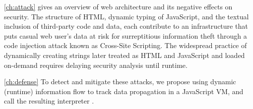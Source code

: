 
%

\autoref{ch:attack} gives an overview of web architecture and its negative effects on security.
The structure of HTML, dynamic typing of JavaScript, and the textual inclusion of third-party code and data, each contribute to an infrastructure that puts casual web user's data at risk for surreptitious information theft through a code injection attack known as Cross-Site Scripting.
The widespread practice of dynamically creating strings later treated as HTML and JavaScript and loaded on-demand requires delaying security analysis until runtime.

\autoref{ch:defense} 
To detect and mitigate these attacks, we propose using dynamic (runtime) information flow to track data propagation in a JavaScript VM, and call the resulting interpreter \FlowCore.

